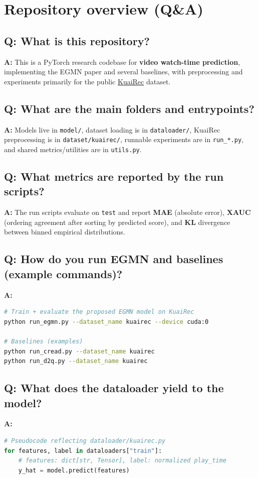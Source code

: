 \section{Repository overview (Q\&A)}

\subsection{Q: What is this repository?}
\noindent\textbf{A:} This is a PyTorch research codebase for \textbf{video watch-time prediction}, implementing the EGMN paper and several baselines, with preprocessing and experiments primarily for the public \href{https://kuairec.com/}{KuaiRec} dataset.

\subsection{Q: What are the main folders and entrypoints?}
\noindent\textbf{A:} Models live in \lstinline|model/|, dataset loading is in \lstinline|dataloader/|, KuaiRec preprocessing is in \lstinline|dataset/kuairec/|, runnable experiments are in \lstinline|run_*.py|, and shared metrics/utilities are in \lstinline|utils.py|.

\subsection{Q: What metrics are reported by the run scripts?}
\noindent\textbf{A:} The run scripts evaluate on \lstinline|test| and report \textbf{MAE} (absolute error), \textbf{XAUC} (ordering agreement after sorting by predicted score), and \textbf{KL} divergence between binned empirical distributions.

\subsection{Q: How do you run EGMN and baselines (example commands)?}
\noindent\textbf{A:}
\begin{lstlisting}[language=bash]
# Train + evaluate the proposed EGMN model on KuaiRec
python run_egmn.py --dataset_name kuairec --device cuda:0

# Baselines (examples)
python run_cread.py --dataset_name kuairec
python run_d2q.py --dataset_name kuairec
\end{lstlisting}

\subsection{Q: What does the dataloader yield to the model?}
\noindent\textbf{A:}
\begin{lstlisting}[language=Python]
# Pseudocode reflecting dataloader/kuairec.py
for features, label in dataloaders["train"]:
    # features: dict[str, Tensor], label: normalized play_time
    y_hat = model.predict(features)
\end{lstlisting}

